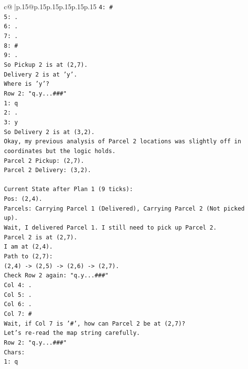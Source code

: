 \documentclass{article}
\begin{document}
{\begin{supertabular}{c@{$\;$}|p{.15\linewidth}@{}p{.15\linewidth}p{.15\linewidth}p{.15\linewidth}p{.15\linewidth}p{.15\linewidth}}
{{{\texttt{4: \#} \\
\texttt{5: .} \\
\texttt{6: .} \\
\texttt{7: .} \\
\texttt{8: \#} \\
\texttt{9: .} \\
\texttt{So Pickup 2 is at (2,7).} \\
\texttt{Delivery 2 is at 'y'.} \\
\texttt{Where is 'y'?} \\
\texttt{Row 2: "q.y...\#\#\#"} \\
\texttt{1: q} \\
\texttt{2: .} \\
\texttt{3: y} \\
\texttt{So Delivery 2 is at (3,2).} \\
\texttt{Okay, my previous analysis of Parcel 2 locations was slightly off in coordinates but the logic holds.} \\
\texttt{Parcel 2 Pickup: (2,7).} \\
\texttt{Parcel 2 Delivery: (3,2).} \\
\\ 
\texttt{Current State after Plan 1 (9 ticks):} \\
\texttt{Pos: (2,4).} \\
\texttt{Parcels: Carrying Parcel 1 (Delivered), Carrying Parcel 2 (Not picked up).} \\
\texttt{Wait, I delivered Parcel 1. I still need to pick up Parcel 2.} \\
\texttt{Parcel 2 is at (2,7).} \\
\texttt{I am at (2,4).} \\
\texttt{Path to (2,7):} \\
\texttt{(2,4) {-}> (2,5) {-}> (2,6) {-}> (2,7).} \\
\texttt{Check Row 2 again: "q.y...\#\#\#"} \\
\texttt{Col 4: .} \\
\texttt{Col 5: .} \\
\texttt{Col 6: .} \\
\texttt{Col 7: \#} \\
\texttt{Wait, if Col 7 is '\#', how can Parcel 2 be at (2,7)?} \\
\texttt{Let's re{-}read the map string carefully.} \\
\texttt{Row 2: "q.y...\#\#\#"} \\
\texttt{Chars:} \\
\texttt{1: q} \\
}}}
\end{supertabular}}
\end{document}
